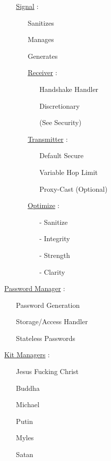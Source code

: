 \documentclass[11pt]{article}
\begin{document}
\begin{enumerate}
\begin{enumerate}
		\item[] \ul{Signal} :
		\begin{enumerate}
			\item[] Sanitizes
			\item[] Manages
			\item[] Generates
			
			\item[] \ul{Receiver}  :
			\begin{enumerate}
				\item[] Handshake Handler
				\item[] Discretionary
				\item[] (See Security)
			\end{enumerate}
			
			\item[] \ul{Transmitter}  :
			\begin{enumerate}
				\item[] Default Secure
				\item[] Variable Hop Limit
				\item[] Proxy-Cast (Optional)
			\end{enumerate}
		
			\item[] \ul{Optimize} :
			\begin{enumerate}
				\item[-] Sanitize
				\item[-] Integrity
				\item[-] Strength
				\item[-] Clarity
			\end{enumerate}
		\end{enumerate}
	\end{enumerate}

	\item[] \ul{Password Manager} :
	\begin{enumerate}
		\item[] Password Generation
		\item[] Storage/Access Handler
		\item[] Stateless Passwords
	\end{enumerate}

	\item[] \ul{Kit Managers} :
	\begin{enumerate}
		\item[] Jesus Fucking Christ
		\item[] Buddha
		\item[] Michael
		\item[] Putin
		\item[] Myles
		\item[] Satan
	\end{enumerate}


\end{enumerate}
\end{document}
